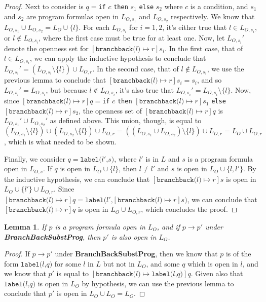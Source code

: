\documentclass[11pt]{article}
\begin{document}
\begin{proof}
Next to consider is $q = $\texttt{if} $c$ \texttt{then} $s_{1}$ \texttt{else} $s_{2}$ where $c$ is a condition, and $s_{1}$ and $s_{2}$ are program formulas open in $L_{O,s_{1}}$ and $L_{O,s_{2}}$ respectively.  We know that $L_{O,s_{1}} \cup L_{O,s_{2}} = L_{O} \cup \{l\}$.  For each $L_{O,s_{i}}$ for $i = 1, 2$, it's either true that $l \in L_{O,s_{i}}$, or $l \notin L_{O,s_{i}}$, where the first case must be true for at least one.  Now, let $L_{O,s_{i}}'$ denote the openness set for $[\texttt{branchback(}l\texttt{)} \mapsto r]s_{i}$.  In the first case, that of $l \in L_{O,s_{i}}$, we can apply the inductive hypothesis to conclude that $L_{O,s_{i}}' = (L_{O,s_{i}} \setminus \{l\}) \cup L_{O,r}$.  In the second case, that of $l \notin L_{O,s_{i}}$, we use the previous lemma to conclude that $[\texttt{branchback(}l\texttt{)} \mapsto r]s_{i} = s_{i}$, and so $L_{O,s_{i}}' = L_{O,s_{i}}$, but because $l \notin L_{O,s_{i}}$, it's also true that $L_{O,s_{i}}' = L_{O,s_{i}} \setminus \{l\}$.  Now, since $[\texttt{branchback(}l\texttt{)} \mapsto r]q = $\texttt{if} $c$ \texttt{then} $[\texttt{branchback(}l\texttt{)} \mapsto r]s_{1}$ \texttt{else} $[\texttt{branchback(}l\texttt{)} \mapsto r]s_{2}$, the openness set of $[\texttt{branchback(}l\texttt{)} \mapsto r]q$ is $L_{O,s_{1}}' \cup L_{O,s_{2}}'$ as defined above.  This union, though, is equal to $(L_{O,s_{1}} \setminus \{l\}) \cup (L_{O,s_{2}} \setminus \{l\}) \cup L_{O,r} = ((L_{O,s_{1}} \cup L_{O,s_{2}}) \setminus \{l\}) \cup L_{O,r} = L_{O} \cup L_{O,r}$, which is what needed to be shown.

Finally, we consider $q = \texttt{label(}l'\texttt{,} s\texttt{)}$, where $l'$ is in $L$ and $s$ is a program formula open in $L_{O,s}$.  If $q$ is open in $L_{O} \cup \{l\}$, then $l \neq l'$ and $s$ is open in $L_{O} \cup \{l, l'\}$.  By the inductive hypothesis, we can conclude that $[\texttt{branchback(}l\texttt{)} \mapsto r]s$ is open in $L_{O} \cup \{l'\} \cup L_{O,r}$.  Since $[\texttt{branchback(}l\texttt{)} \mapsto r]q = \texttt{label(}l'\texttt{,} [\texttt{branchback(}l\texttt{)} \mapsto r]s\texttt{)}$, we can conclude that $[\texttt{branchback(}l\texttt{)} \mapsto r]q$ is open in $L_{O} \cup L_{O,r}$, which concludes the proof.
\end{proof}

\newtheorem*{bbppreservesopenness}{Lemma}
\begin{bbppreservesopenness}
If $p$ is a program formula open in $L_{O}$, and if $p \longrightarrow p'$ under \textbf{BranchBackSubstProg}, then $p'$ is also open in $L_{O}$.
\end{bbppreservesopenness}
\begin{proof}
If $p \longrightarrow p'$ under \textbf{BranchBackSubstProg}, then we know that $p$ is of the form $\texttt{label(}l\texttt{,} q \texttt{)}$ for some $l$ in $L$ but not in $L_{O}$, and some $q$ which is open in $l$, and we know that $p'$ is equal to $[\texttt{branchback(}l\texttt{)} \mapsto \texttt{label(}l\texttt{,} q\texttt{)}]q$.  Given also that $\texttt{label(}l\texttt{,} q \texttt{)}$ is open in $L_{O}$ by hypothesis, we can use the previous lemma to conclude that $p'$ is open in $L_{O} \cup L_{O} = L_{O}$.
\end{proof}
\end{document}
